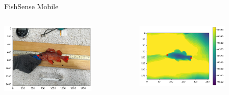 \begin{frame}{FishSense Mobile}
     \begin{columns}
         \begin{column}{0.5\textwidth}
             \centering
             \includegraphics[height=0.7\textheight,width=0.7\textwidth,keepaspectratio]{images/fs_rgb_3.png}
         \end{column}
         \begin{column}{0.5\textwidth}
             \centering
             \includegraphics[height=0.7\textheight,width=0.7\textwidth,keepaspectratio]{images/fs_depth_3.png}
         \end{column}
     \end{columns}
\end{frame}


